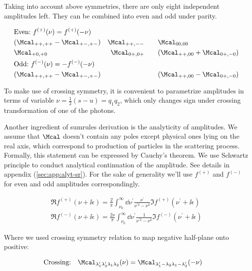 Taking into account above symmetries, there are only eight independent amplitudes left. They can be combined into even and odd under parity.

\begin{align}
    &\text{Even:}~f^{(+)}(\nu) = f^{(+)}(-\nu) && \\ \nonumber
    &(\Mcal_{++,++}-\Mcal_{+-,+-}) &\Mcal_{++,--}\qquad &\Mcal_{00,00}\\
    &\Mcal_{+0,+0} &\Mcal_{0+,0+}\qquad &(\Mcal_{++,00} + \Mcal_{0+,-0})\\
    &\text{Odd:}~f^{(-)}(\nu) = -f^{(-)}(-\nu) && \\ \nonumber
    &(\Mcal_{++,++} - \Mcal_{+-,+-}) & &(\Mcal_{++,00} - \Mcal_{0+,-0})
\end{align}

To make use of crossing symmetry, it is convenient to parametrize amplitudes in terms of variable $\nu = \frac{1}{2} (s - u) = q_1 q_2$, which only changes sign under crossing transformation of one of the photons.

Another ingredient of sumrules derivation is the analyticity of amplitudes. We assume that $\Mcal$ doesn't contain any poles except physical ones lying on the real axis, which correspond to production of particles in the scattering process. Formally, this statement can be expressed by Cauchy's theorem. We use Schwartz principle to conduct analytical continuation of the amplitude. See details in appendix (\cref{sec:app:alyt-sr}). For the sake of generality we'll use $f^{(+)}$ and $f^{(-)}$ for even and odd amplitudes correspondingly.

\begin{align}
    \Re f^{(+)}(\nu + \ii \epsilon) = \frac{2}{\pi} \int_{\nu_0}^{\infty} \dd{\nu^\prime} \frac{\nu^\prime}{\nu^{\prime 2} - \nu^2} \Im f^{(+)}(\nu^\prime + \ii \epsilon) \\
    \Re f^{(-)}(\nu + \ii \epsilon) = \frac{2\nu}{\pi} \int_{\nu_0}^{\infty} \dd{\nu^\prime} \frac{1}{\nu^{\prime 2} - \nu^2} \Im f^{(-)}(\nu^\prime + \ii \epsilon)
\end{align}

Where we used crossing symmetry relation to map negative half-plane onto positive:

\begin{align}
    & \text{Crossing:}\quad \Mcal_{\lambda_1^\prime \lambda_2^\prime \lambda_1 \lambda_2}(\nu) = \Mcal_{\lambda_1^\prime -\lambda_2 \lambda_1 -\lambda_2^\prime}(-\nu)
\end{align}


